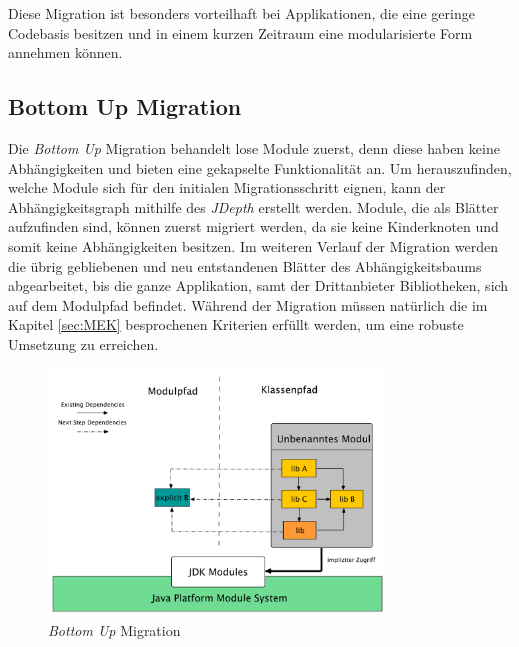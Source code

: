 	Diese Migration ist besonders vorteilhaft bei Applikationen, die eine geringe Codebasis besitzen und in einem kurzen Zeitraum eine modularisierte Form annehmen können. 

\subsection{Bottom Up Migration} \label{sec:bottomUP}
	Die \textit{Bottom Up} Migration behandelt lose Module zuerst, denn diese haben keine Abhängigkeiten und bieten eine gekapselte Funktionalität an. Um herauszufinden, welche Module sich für den initialen Migrationsschritt eignen, kann der Abhängigkeitsgraph mithilfe des \textit{JDepth} erstellt werden. Module, die als Blätter aufzufinden sind, können zuerst migriert werden, da sie keine Kinderknoten und somit keine Abhängigkeiten besitzen. Im weiteren Verlauf der Migration werden die übrig gebliebenen und neu entstandenen Blätter des Abhängigkeitsbaums abgearbeitet, bis die ganze Applikation, samt der Drittanbieter Bibliotheken, sich auf dem Modulpfad befindet. Während der Migration müssen natürlich die im Kapitel \ref{sec:MEK} besprochenen Kriterien erfüllt werden, um eine robuste Umsetzung zu erreichen. \cite{javaMod9,modulProgJava9,java9modRevealed,modulMitJava9,masteringJava9} \bigbreak
	\begin{figure}[h]
		\centering
	    \includegraphics[width=0.8\textwidth]{material/images/bottom-up-migrate.pdf}
	    \caption{\textit{Bottom Up} Migration \cite{modulMitJava9}}
	    \label{fig:BUM}
  	\end{figure}
